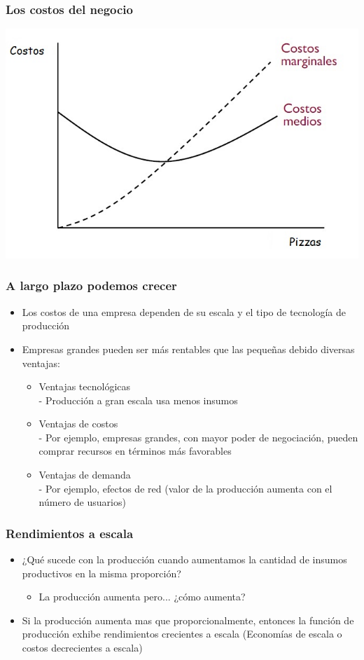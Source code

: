 \documentclass{beamer}
\begin{document}
\begin{frame}
\frametitle{ Los costos del negocio}
\centering
\includegraphics[scale=0.6]{Figures/Tema_06.20.jpg}
\end{frame}

\begin{frame}
\frametitle{ A largo plazo podemos crecer}
\begin{itemize}
    \item Los costos de una empresa dependen de su escala y el tipo de tecnología de producción
    \item Empresas grandes pueden ser más rentables que las pequeñas debido diversas ventajas:
    \begin{itemize}
        \item Ventajas tecnológicas \\
        - Producción a gran escala usa menos insumos
        \item Ventajas de costos \\
        - Por ejemplo, empresas grandes, con mayor poder de negociación, pueden comprar recursos en términos más favorables
        \item Ventajas de demanda \\
        - Por ejemplo, efectos de red (valor de la producción aumenta con el número de usuarios)
    \end{itemize}
\end{itemize}
\end{frame}

\begin{frame}
\frametitle{ Rendimientos a escala}
\begin{itemize}
    \item ¿Qué sucede con la producción cuando aumentamos la cantidad de insumos productivos en la misma proporción?
    \begin{itemize}
        \item La producción aumenta pero... ¿cómo aumenta?
    \end{itemize}
    \item Si la producción aumenta mas que proporcionalmente, entonces la función de producción exhibe rendimientos crecientes a escala (Economías de escala o costos decrecientes a escala)
\end{itemize}
\end{frame}
\end{document}
